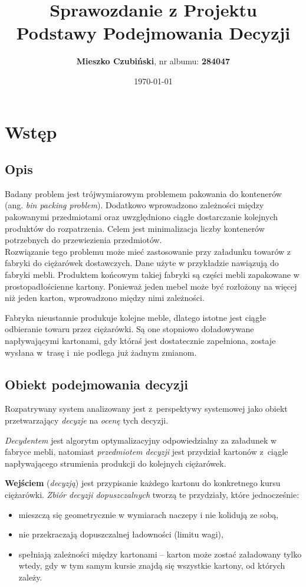 \documentclass[12pt]{article}
\title{\textbf{Sprawozdanie z Projektu} \\ \textbf{Podstawy Podejmowania Decyzji}}
\author{\textbf{Mieszko Czubiński}, nr albumu: \textbf{284047}}
\date{\today}
\begin{document}
\maketitle

\section{Wstęp}

\subsection{Opis}

Badany problem jest trójwymiarowym problemem pakowania do kontenerów (ang. \textit{bin packing problem}). Dodatkowo wprowadzono zależności między pakowanymi przedmiotami oraz uwzględniono ciągłe dostarczanie kolejnych produktów do rozpatrzenia. Celem jest minimalizacja liczby kontenerów potrzebnych do przewiezienia przedmiotów. \\

Rozwiązanie tego problemu może mieć zastosowanie przy załadunku towarów z fabryki do ciężarówek dostawczych. Dane użyte w przykładzie nawiązują do fabryki mebli. Produktem końcowym takiej fabryki są części mebli zapakowane w prostopadłościenne kartony. Ponieważ jeden mebel może być rozłożony na więcej niż jeden karton, wprowadzono między nimi zależności.

Fabryka nieustannie produkuje kolejne meble, dlatego istotne jest ciągłe odbieranie towaru przez ciężarówki. Są one stopniowo doładowywane napływającymi kartonami, gdy któraś jest dostatecznie zapełniona, zostaje wysłana w~trasę i~nie podlega już żadnym zmianom.

\subsection{Obiekt podejmowania decyzji}

Rozpatrywany system analizowany jest z~perspektywy systemowej jako obiekt przetwarzający \textit{decyzje} na \textit{ocenę} tych decyzji.

\textit{Decydentem} jest algorytm optymalizacyjny odpowiedzialny za załadunek w fabryce mebli, natomiast \textit{przedmiotem decyzji} jest przydział kartonów z~ciągle napływającego strumienia produkcji do kolejnych ciężarówek.

\textbf{Wejściem} (\textit{decyzją}) jest przypisanie każdego kartonu do konkretnego kursu ciężarówki. \textit{Zbiór decyzji dopuszczalnych} tworzą te przydziały, które jednocześnie:
\begin{itemize}
    \item mieszczą się geometrycznie w wymiarach naczepy i nie kolidują ze sobą,
    \item nie przekraczają dopuszczalnej ładowności (limitu wagi),
    \item spełniają zależności między kartonami -- karton może zostać załadowany tylko wtedy, gdy w tym samym kursie znajdą się wszystkie kartony, od których zależy.
\end{itemize}
\end{document}
